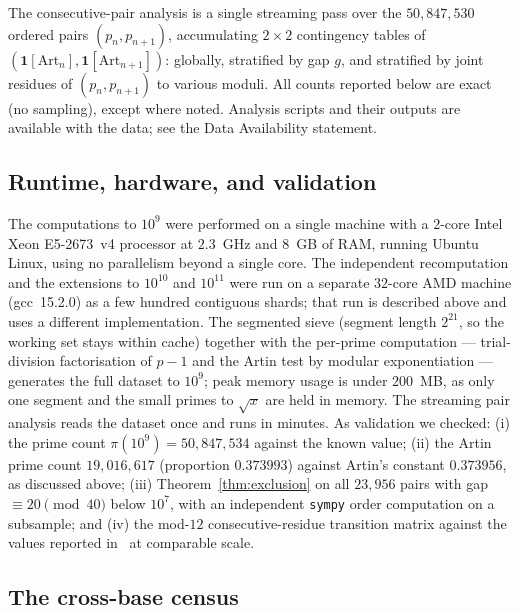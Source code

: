 \documentclass[11pt,reqno]{amsart}
\theoremstyle{plain}
\theoremstyle{definition}
\newcommand{\Art}{\mathrm{Art}}
\begin{document}
\begin{sloppypar}
The consecutive-pair analysis is a single streaming pass over the
$50{,}847{,}530$ ordered pairs $(p_n, p_{n+1})$, accumulating $2 \times 2$
contingency tables of $(\mathbf{1}[\Art_n], \mathbf{1}[\Art_{n+1}])$:
globally, stratified by gap $g$, and stratified by joint residues of
$(p_n, p_{n+1})$ to various moduli. All counts reported below are exact
(no sampling), except where noted. Analysis scripts and their outputs are
available with the data; see the Data Availability statement.
\end{sloppypar}

\subsection*{Runtime, hardware, and validation}
The computations to $10^9$ were performed on a single machine with a $2$-core
Intel Xeon E5-2673~v4 processor at $2.3$~GHz and $8$~GB of RAM, running Ubuntu
Linux, using no parallelism beyond a single core. The independent
recomputation and the extensions to $10^{10}$ and $10^{11}$ were run on a
separate $32$-core AMD machine (gcc~15.2.0) as a few hundred contiguous
shards; that run is described above and uses a different implementation. The
segmented sieve (segment length $2^{21}$, so the working set stays within
cache) together with the per-prime computation --- trial-division
factorisation of $p - 1$ and the Artin test by modular exponentiation ---
generates the full dataset to $10^9$; peak memory usage is
under $200$~MB, as only one segment and the small primes to $\sqrt{x}$ are
held in memory. The streaming pair analysis reads the dataset once and runs in
minutes. As validation we checked: (i) the prime count $\pi(10^9) =
	50{,}847{,}534$ against the known value; (ii) the Artin prime count
$19{,}016{,}617$ (proportion $0.373993$) against Artin's constant
$0.373956$, as discussed above; (iii) Theorem~\ref{thm:exclusion} on all
$23{,}956$ pairs with gap $\equiv 20 \pmod{40}$ below $10^7$, with an
independent \texttt{sympy} order computation on a subsample; and (iv) the
mod-$12$ consecutive-residue transition matrix against the values reported
in~\cite{LOS2016} at comparable scale.




\subsection*{The cross-base census}
\end{document}
